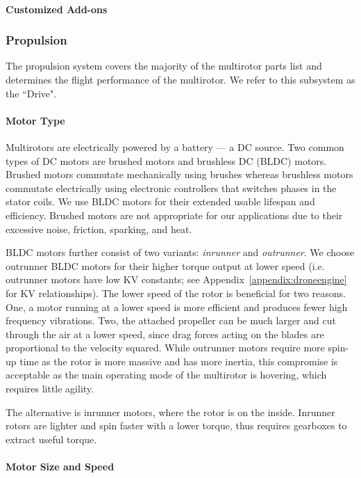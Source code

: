 \paragraph{Customized Add-ons}

\subsubsection{Propulsion}

The propulsion system covers the majority of the multirotor parts list and determines the flight performance of the multirotor. We refer to this subsystem as the ``Drive".
\paragraph{Motor Type}
Multirotors are electrically powered by a battery --- a DC source. Two common types of DC motors are  brushed motors and brushless DC (BLDC) motors. Brushed motors commutate mechanically using brushes whereas brushless motors commutate electrically using electronic controllers that switches phases in the stator coils. We use BLDC motors for their extended usable lifespan and efficiency. Brushed motors are not appropriate for our applications due to their excessive noise, friction, sparking, and heat.

BLDC motors further consist of two variants: \textit{inrunner} and \textit{outrunner}. We choose outrunner BLDC motors for their higher torque output at lower speed  (i.e. outrunner motors have low KV constants; see Appendix~\ref{appendix:droneengine} for KV relationships). The lower speed of the rotor is beneficial for two reasons. One, a motor running at a lower speed is more efficient and produces fewer high frequency vibrations. Two, the attached propeller can be much larger and cut through the air at a lower speed, since drag forces acting on the blades are proportional to the velocity squared. While outrunner motors require more spin-up time as the rotor is more massive and has more inertia, this compromise is acceptable as the main operating mode of the multirotor is hovering, which requires little agility. 

The alternative is inrunner motors, where the rotor is on the inside. Inrunner rotors are lighter and spin faster with a lower torque, thus requires gearboxes to extract useful torque\cite{invsoutrunner}.

\paragraph{Motor Size and Speed}\label{section:motor-speed}

